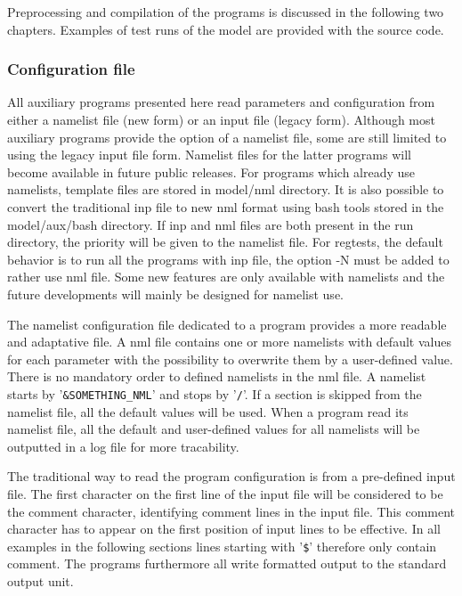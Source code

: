 \noindent
Preprocessing and compilation of the programs is discussed in the following
two chapters. Examples of test runs of the model are provided with the source
code.

\vsssub
\subsubsection{Configuration file}
\vsssub

All auxiliary programs presented here read parameters and configuration from
either a namelist file (new form) or an input file (legacy form). Although most
auxiliary programs provide the option of a namelist file, some are still limited 
to using the legacy input file form. Namelist files for the latter programs
will become available in future public releases. For programs which already use 
namelists, template files are stored in model/nml directory. It is also possible
to convert the traditional {\file inp} file to new {\file nml} format using 
{\code bash} tools stored in the model/aux/bash directory. If {\file inp} 
and {\file nml} files are both present in
the run directory, the priority will be given to the namelist file. For
regtests, the default behavior is to run all the programs with {\file inp} file, the
option -N must be added to rather use {\file nml} file. Some new features are only 
available with namelists and the future developments will mainly be designed
for namelist use.

The namelist configuration file dedicated to a program provides a more 
readable and adaptative file. A {\file nml} file contains one or more namelists with
default values for each parameter with the possibility to overwrite them by a
user-defined value. There is no mandatory order to defined namelists in the
nml file. A namelist starts by '{\tt \&SOMETHING\_NML}' and stops by '{\tt /}'.
If a section is skipped from the namelist file, all the default values will be
used. When a program read its namelist file, all the default and user-defined
values for all namelists will be outputted in a log file for more tracability.

The traditional way to read the program configuration is from a pre-defined
input file. The first character on the first line of the input file will be
considered to be the comment character, identifying comment lines in the input
file. This comment character has to appear on the first position of input
lines to be effective. In all examples in the following sections lines starting
with '{\tt \$}' therefore only contain comment. The programs furthermore all
write formatted output to the standard output unit.

